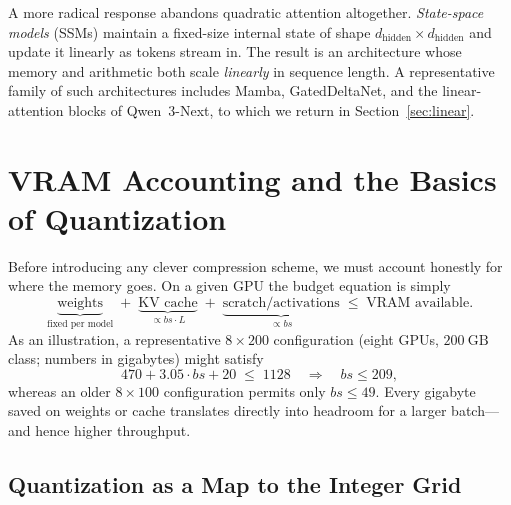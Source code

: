 \documentclass[11pt,a4paper]{article}
\theoremstyle{definition}
\theoremstyle{remark}
\theoremstyle{plain}
\begin{document}
A more radical response abandons quadratic attention altogether.
\emph{State-space models} (SSMs) maintain a fixed-size internal state of
shape $d_{\text{hidden}} \times d_{\text{hidden}}$ and update it linearly
as tokens stream in. The result is an architecture whose memory and
arithmetic both scale \emph{linearly} in sequence length. A representative
family of such architectures includes Mamba, GatedDeltaNet, and the
linear-attention blocks of Qwen~3-Next, to which we return in
Section~\ref{sec:linear}.

\section{VRAM Accounting and the Basics of Quantization}
\label{sec:quant-basics}

Before introducing any clever compression scheme, we must account honestly
for where the memory goes. On a given GPU the budget equation is simply
\begin{equation}
  \underbrace{\text{weights}}_{\text{fixed per model}} \;+\;
  \underbrace{\text{KV cache}}_{\propto bs \cdot L} \;+\;
  \underbrace{\text{scratch/activations}}_{\propto bs} \;\leq\;
  \text{VRAM available}.
  \label{eq:vram-budget}
\end{equation}
As an illustration, a representative $8 \times 200$ configuration (eight
GPUs, $200~\text{GB}$ class; numbers in gigabytes) might satisfy
\begin{equation}
  470 + 3.05 \cdot bs + 20 \;\leq\; 1128 \quad\Longrightarrow\quad bs \leq 209,
\end{equation}
whereas an older $8 \times 100$ configuration permits only $bs \leq 49$.
Every gigabyte saved on weights or cache translates directly into headroom
for a larger batch---and hence higher throughput.

\subsection{Quantization as a Map to the Integer Grid}
\end{document}

